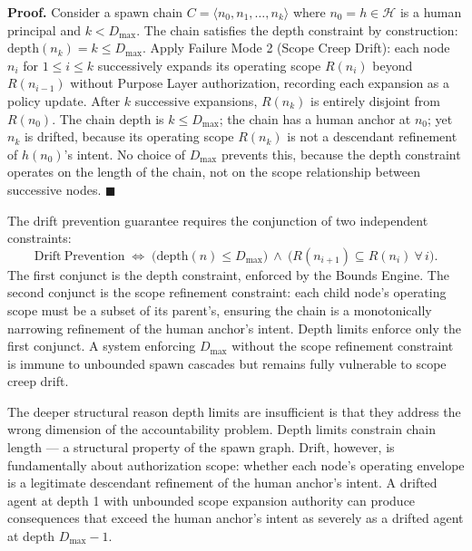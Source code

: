 \medskip
\noindent\textbf{Proof.} Consider a spawn chain $C = \langle n_0, n_1, \ldots, n_k \rangle$ where $n_0 = h \in \mathcal{H}$ is a human principal and $k < D_{\max}$. The chain satisfies the depth constraint by construction: $\mathrm{depth}(n_k) = k \leq D_{\max}$. Apply Failure Mode 2 (Scope Creep Drift): each node $n_i$ for $1 \leq i \leq k$ successively expands its operating scope $R(n_i)$ beyond $R(n_{i-1})$ without Purpose Layer authorization, recording each expansion as a policy update. After $k$ successive expansions, $R(n_k)$ is entirely disjoint from $R(n_0)$. The chain depth is $k \leq D_{\max}$; the chain has a human anchor at $n_0$; yet $n_k$ is drifted, because its operating scope $R(n_k)$ is not a descendant refinement of $h(n_0)$'s intent. No choice of $D_{\max}$ prevents this, because the depth constraint operates on the length of the chain, not on the scope relationship between successive nodes. $\blacksquare$

The drift prevention guarantee requires the conjunction of two independent constraints:
\begin{equation}
\mathrm{Drift\ Prevention} \;\Longleftrightarrow\; \bigl( \mathrm{depth}(n) \leq D_{\max} \bigr)\ \land\ \bigl( R(n_{i+1}) \subseteq R(n_i)\ \forall\, i \bigr).
\label{eq:rs-drift-prevention-constraint}
\end{equation}
The first conjunct is the depth constraint, enforced by the Bounds Engine. The second conjunct is the scope refinement constraint: each child node's operating scope must be a subset of its parent's, ensuring the chain is a monotonically narrowing refinement of the human anchor's intent. Depth limits enforce only the first conjunct. A system enforcing $D_{\max}$ without the scope refinement constraint is immune to unbounded spawn cascades but remains fully vulnerable to scope creep drift.

The deeper structural reason depth limits are insufficient is that they address the wrong dimension of the accountability problem. Depth limits constrain chain length — a structural property of the spawn graph. Drift, however, is fundamentally about authorization scope: whether each node's operating envelope is a legitimate descendant refinement of the human anchor's intent. A drifted agent at depth 1 with unbounded scope expansion authority can produce consequences that exceed the human anchor's intent as severely as a drifted agent at depth $D_{\max} - 1$.

